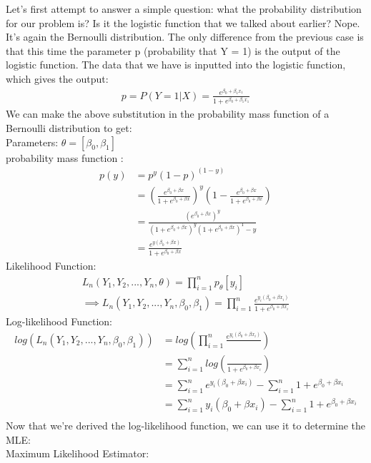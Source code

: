 Let’s first attempt to answer a simple question: what the probability distribution for our problem is? Is it the logistic function that we talked about earlier? Nope. It’s again the Bernoulli distribution. The only difference from the previous case is that this time the parameter p (probability that Y = 1) is the output of the logistic function. The data that we have is inputted into the logistic function, which gives the output:
\begin{align*}
    p = P(Y=1|X) = { \frac{e^{\beta_0 + \beta_1 x_1}}{ {1+e^{\beta_0 + \beta_1 x_1}}} }
\end{align*}
We can make the above substitution in the probability mass function of a Bernoulli distribution to get:
\\Parameters: $\theta = [\beta_0, \beta_1]$
\\probability mass function :
\begin{align*}
    p(y) &= p^y(1-p)^{(1-y)} \\
    &= \left(\frac{e^{\beta_0+\beta x}}{ {1+e^{\beta_0+\beta x}}}\right)^y \left(1-\frac{e^{\beta_0+\beta x}}{ {1+e^{\beta_0+\beta x}}}\right)\\
    &= \frac{( e^{\beta_0+\beta x} )^y}{(1+e^{\beta_0+\beta x})^y(1+e^{\beta_0+\beta x})^1-y}\\
    &= \frac{e^{y(\beta_0+\beta x)}}{1+e^{\beta_0+\beta x}}
\end{align*}
Likelihood Function:
\begin{align*}
     L_n(Y_1,Y_2, ...,Y_n,\theta) = \prod_{i=1}^n  p_\theta[y_i]\\
     \implies L_n(Y_1,Y_2, ...,Y_n,\beta_0, \beta_1) = \prod_{i=1}^n\frac{e^{y_i(\beta_0+\beta x_i)}}{1+e^{\beta_0+\beta x_i}}
\end{align*}
Log-likelihood Function:
\begin{align*}
    log(L_n(Y_1,Y_2, ...,Y_n,\beta_0, \beta_1) ) &=log\left(\prod_{i=1}^n\frac{e^{y_i(\beta_0+\beta x_i)}}{}\right)\\
    &=\sum_{i=1}^n log\left(\frac{}{1+e^{\beta_0+\beta x_i}}\right)\\
    &= \sum_{i=1}^n e^{y_i(\beta_0+\beta x_i)} - \sum_{i=1}^n 1+e^{\beta_0+\beta x_i}\\
    &= \sum_{i=1}^n y_i(\beta_0+\beta x_i) - \sum_{i=1}^n 1+e^{\beta_0+\beta x_i}\\
\end{align*}
Now that we’re derived the log-likelihood function, we can use it to determine the MLE:\\
Maximum Likelihood Estimator:

